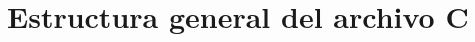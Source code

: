\documentclass{article}
\begin{document}
\section{Estructura general del archivo C}

\end{document}

